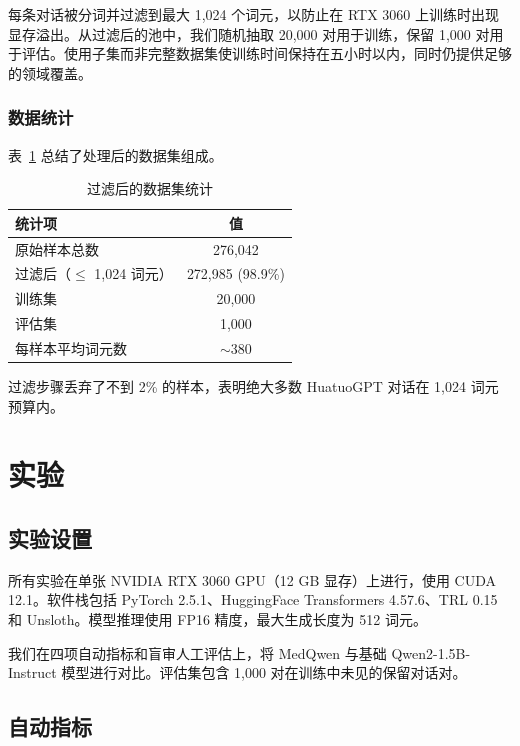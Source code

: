 \documentclass[12pt,a4paper]{article}
\begin{document}
每条对话被分词并过滤到最大 1,024 个词元，以防止在 RTX 3060 上训练时出现显存溢出。从过滤后的池中，我们随机抽取 20,000 对用于训练，保留 1,000 对用于评估。使用子集而非完整数据集使训练时间保持在五小时以内，同时仍提供足够的领域覆盖。

\subsubsection{数据统计}

表~\ref{tab:data_stats} 总结了处理后的数据集组成。

\begin{table}[ht]
\centering
\caption{过滤后的数据集统计}
\label{tab:data_stats}
\begin{tabular}{lc}
\toprule
\textbf{统计项} & \textbf{值} \\
\midrule
原始样本总数 & 276,042 \\
过滤后（$\leq$ 1,024 词元） & 272,985 (98.9\%) \\
训练集 & 20,000 \\
评估集 & 1,000 \\
每样本平均词元数 & $\sim$380 \\
\bottomrule
\end{tabular}
\end{table}

过滤步骤丢弃了不到 2\% 的样本，表明绝大多数 HuatuoGPT 对话在 1,024 词元预算内。

\section{实验}
\label{sec:experiments}

\subsection{实验设置}

所有实验在单张 NVIDIA RTX 3060 GPU（12 GB 显存）上进行，使用 CUDA 12.1。软件栈包括 PyTorch 2.5.1、HuggingFace Transformers 4.57.6、TRL 0.15 和 Unsloth。模型推理使用 FP16 精度，最大生成长度为 512 词元。

我们在四项自动指标和盲审人工评估上，将 MedQwen 与基础 Qwen2-1.5B-Instruct 模型进行对比。评估集包含 1,000 对在训练中未见的保留对话对。

\subsection{自动指标}
\end{document}
